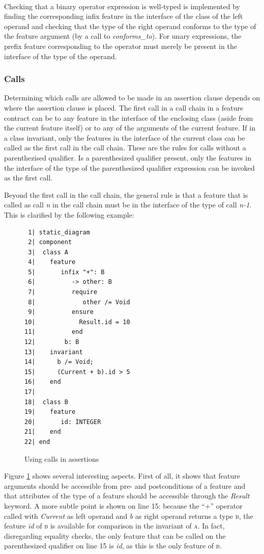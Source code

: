 \paragraph{}
Checking that a binary operator expression is well-typed is implemented by finding the corresponding infix feature in the interface of the class of the left operand and checking that the type of the right operand conforms to the type of the feature argument (by a call to \textit{conforms\_to}). For unary expressions, the prefix feature corresponding to the operator must merely be present in the interface of the type of the operand. 
\subsubsection{Calls}
Determining which calls are allowed to be made in an assertion clause depends on where the assertion clause is placed. The first call in a call chain in a feature contract can be to any feature in the interface of the enclosing class (aside from the current feature itself) or to any of the arguments of the current feature. If in a class invariant, only the features in the interface of the current class can be called as the first call in the call chain. These are the rules for calls without a parenthezised qualifier. Is a parenthesized qualifier present, only the features in the interface of the type of the parenthesized qualifier expression can be invoked as the first call.

Beyond the first call in the call chain, the general rule is that a feature that is called as call \textit{n} in the call chain must be in the interface of the type of call \textit{n-1}. This is clarified by the following example:
\begin{figure}[H]
{\footnotesize
\begin{verbatim}
 1| static_diagram
 2| component
 3|  class A
 4|    feature
 5|       infix "+": B
 6|          -> other: B
 7|          require
 8|             other /= Void
 9|          ensure
10|            Result.id = 10
11|          end
12|        b: B
13|    invariant
14|      b /= Void;
15|      (Current + b).id > 5
16|    end
17|  
18|  class B
19|    feature
20|       id: INTEGER
21|    end
22| end
\end{verbatim}
}
\caption{Using calls in assertions}
\label{fig:call_assertions}
\end{figure}
Figure \ref{fig:call_assertions} shows several interesting aspects. First of all, it shows that feature arguments should be accessible from pre- and postconditions of a feature and that attributes of the type of a feature should be accessible through the \textit{Result} keyword. A more subtle point is shown on line 15: because the ``+'' operator called with \textit{Current} as left operand and \textit{b} as right operand returns a type \textsc{b}, the feature \textit{id} of \textsc{b} is available for comparison in the invariant of \textsc{a}. In fact, disregarding equality checks, the only feature that can be called on the parenthesized qualifier on line 15 is \textit{id}, as this is the only feature of \textsc{b}.
